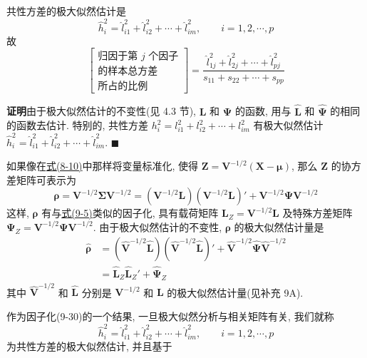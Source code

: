 共性方差的极大似然估计是
\label{eq:9-27}
\begin{equation}
\hat{h}_i^2=\hat{l}_{i1}^2+\hat{l}_{i2}^2+\cdots+\hat{l}_{im}^2,\qquad i=1,2,\cdots,p
\tag{9-27}
\end{equation}
故
\label{eq:9-28}
\begin{equation}
\left[\begin{array}{c}
\text{归因于第 } j \text{ 个因子}\\
\text{的样本总方差}\\
\text{所占的比例}
\end{array}\right]
=\frac{\hat{l}_{1j}^2+\hat{l}_{2j}^2+\cdots+\hat{l}_{pj}^2}{s_{11}+s_{22}+\cdots+s_{pp}}
\tag{9-28}
\end{equation}

\noindent\textbf{证明}\quad 由于极大似然估计的不变性(见 4.3 节), $\mathbf{L}$ 和 $\boldsymbol{\Psi}$ 的函数, 用与 $\hat{\mathbf{L}}$ 和 $\hat{\boldsymbol{\Psi}}$ 的相同的函数去估计. 特别的, 共性方差 $h_i^2=l_{i1}^2+l_{i2}^2+\cdots+l_{im}^2$ 有极大似然估计 $\hat{h}_i^2=\hat{l}_{i1}^2+\hat{l}_{i2}^2+\cdots+\hat{l}_{im}^2$. \hfill$\blacksquare$

如果像在\hyperref[eq:8-10]{式(8-10)}中那样将变量标准化, 使得 $\mathbf{Z}=\mathbf{V}^{-1/2}(\mathbf{X}-\boldsymbol{\mu})$, 那么 $\mathbf{Z}$ 的协方差矩阵可表示为
\label{eq:9-29}
\begin{equation}
\boldsymbol{\rho}=\mathbf{V}^{-1/2}\boldsymbol{\Sigma}\mathbf{V}^{-1/2}=(\mathbf{V}^{-1/2}\mathbf{L})(\mathbf{V}^{-1/2}\mathbf{L})'+\mathbf{V}^{-1/2}\boldsymbol{\Psi}\mathbf{V}^{-1/2}
\tag{9-29}
\end{equation}
这样, $\boldsymbol{\rho}$ 有与\hyperref[eq:9-5]{式(9-5)}类似的因子化, 具有载荷矩阵 $\mathbf{L}_Z=\mathbf{V}^{-1/2}\mathbf{L}$ 及特殊方差矩阵 $\boldsymbol{\Psi}_Z=\mathbf{V}^{-1/2}\boldsymbol{\Psi}\mathbf{V}^{-1/2}$. 由于极大似然估计的不变性, $\boldsymbol{\rho}$ 的极大似然估计量是
\label{eq:9-30}
\begin{equation}
\begin{aligned}
\hat{\boldsymbol{\rho}}&=(\hat{\mathbf{V}}^{-1/2}\hat{\mathbf{L}})(\hat{\mathbf{V}}^{-1/2}\hat{\mathbf{L}})'+\hat{\mathbf{V}}^{-1/2}\hat{\boldsymbol{\Psi}}\hat{\mathbf{V}}^{-1/2}\\
&=\hat{\mathbf{L}}_Z\hat{\mathbf{L}}_Z'+\hat{\boldsymbol{\Psi}}_Z
\end{aligned}
\tag{9-30}
\end{equation}
其中 $\hat{\mathbf{V}}^{-1/2}$ 和 $\hat{\mathbf{L}}$ 分别是 $\mathbf{V}^{-1/2}$ 和 $\mathbf{L}$ 的极大似然估计量(见补充 9A).

作为因子化(9-30)的一个结果, 一旦极大似然分析与相关矩阵有关, 我们就称
\label{eq:9-31}
\begin{equation}
\hat{h}_i^2=\hat{l}_{i1}^2+\hat{l}_{i2}^2+\cdots+\hat{l}_{im}^2,\qquad i=1,2,\cdots,p
\tag{9-31}
\end{equation}
为共性方差的极大似然估计, 并且基于
